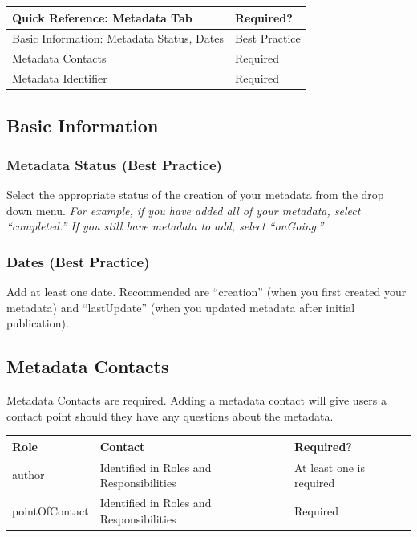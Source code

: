 \documentclass[
]{book}
\begin{document}
\begin{longtable}[]{@{}ll@{}}
\toprule
Quick Reference: Metadata Tab & Required?\tabularnewline
\midrule
\endhead
Basic Information: Metadata Status, Dates & Best Practice\tabularnewline
Metadata Contacts & Required\tabularnewline
Metadata Identifier & Required\tabularnewline
\bottomrule
\end{longtable}

\hypertarget{basic-information-1}{%
\subsection{Basic Information}\label{basic-information-1}}

\hypertarget{metadata-status-best-practice}{%
\subsubsection{Metadata Status (Best Practice)}\label{metadata-status-best-practice}}

Select the appropriate status of the creation of your metadata from the drop down menu. \emph{For example, if you have added all of your metadata, select ``completed.'' If you still have metadata to add, select ``onGoing.''}

\hypertarget{dates-best-practice-1}{%
\subsubsection{Dates (Best Practice)}\label{dates-best-practice-1}}

Add at least one date. Recommended are ``creation'' (when you first created your metadata) and ``lastUpdate'' (when you updated metadata after initial publication).

\hypertarget{metadata-contacts}{%
\subsection{Metadata Contacts}\label{metadata-contacts}}

Metadata Contacts are required. Adding a metadata contact will give users a contact point should they have any questions about the metadata.

\begin{longtable}[]{@{}lll@{}}
\toprule
Role & Contact & Required?\tabularnewline
\midrule
\endhead
author & Identified in Roles and Responsibilities & At least one is required\tabularnewline
pointOfContact & Identified in Roles and Responsibilities & Required\tabularnewline
\bottomrule
\end{longtable}
\end{document}
